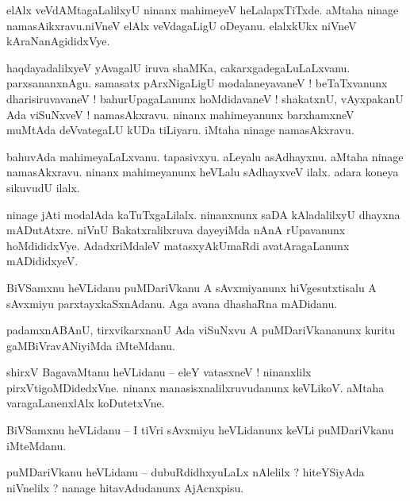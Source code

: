 \documentclass{article}
\begin{document}
\begin{mn}%
elAlx veVdAMtagaLalilxyU ninanx mahimeyeV heLalapxTiTxde. aMtaha ninage namasAikxravu.niVneV elAlx 
veVdagaLigU oDeyanu. elalxkUkx niVneV kAraNanAgididxVye.
\end{mn}

\begin{mn}%
haqdayadalilxyeV yAvagalU iruva shaMKa, cakarxgadegaLuLaLxvanu. parxsananxnAgu. samasatx 
pArxNigaLigU modalaneyavaneV ! beTaTxvanunx dharisiruvavaneV ! bahurUpagaLanunx hoMdidavaneV ! 
shakatxnU, vAyxpakanU Ada viSuNxveV ! namasAkxravu. ninanx mahimeyanunx barxhamxneV muMtAda 
deVvategaLU kUDa tiLiyaru. iMtaha ninage namasAkxravu.
\end{mn}

\begin{mn}%
bahuvAda mahimeyaLaLxvanu. tapasivxyu. aLeyalu asAdhayxnu. aMtaha ninage namasAkxravu. ninanx  
mahimeyanunx heVLalu sAdhayxveV ilalx. adara koneya sikuvudU ilalx.
\end{mn}

\begin{mn}%
ninage jAti modalAda kaTuTxgaLilalx. ninanxnunx saDA kAladalilxyU dhayxna mADutAtxre. niVnU 
Bakatxralilxruva dayeyiMda nAnA rUpavanunx hoMdididxVye. AdadxriMdaleV matasxyAkUmaRdi 
avatAragaLanunx mADididxyeV.
\end{mn}

\begin{mn}%
BiVSamxnu heVLidanu puMDariVkanu A sAvxmiyanunx hiVgesutxtisalu A sAvxmiyu parxtayxkaSxnAdanu. Aga 
avana dhashaRna mADidanu.
\end{mn}

\begin{mn}%
padamxnABAnU, tirxvikarxnanU Ada viSuNxvu A puMDariVkananunx kuritu gaMBiVravANiyiMda iMteMdanu.
\end{mn}

\begin{mn}%
shirxV BagavaMtanu heVLidanu -- eleY vatasxneV ! ninanxlilx pirxVtigoMDidedxVne. ninanx 
manasisxnalilxruvudanunx keVLikoV. aMtaha varagaLanenxlAlx koDutetxVne.
\end{mn}

\begin{mn}%
BiVSamxnu heVLidanu -- I tiVri sAvxmiyu heVLidanunx keVLi puMDariVkanu iMteMdanu.
\end{mn}

\begin{mn}%
puMDariVkanu heVLidanu -- dubuRdidhxyuLaLx nAlelilx ? hiteYSiyAda niVnelilx ? nanage hitavAdudanunx 
AjAcnxpisu.
\end{mn}
\end{document}
